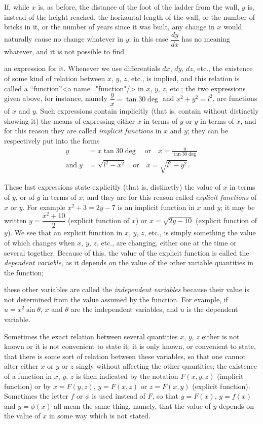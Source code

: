 \documentclass{ximera}
\begin{document}
If, while $x$ is, as before, the distance of the foot
of the ladder from the wall, $y$ is, instead of the
height reached, the horizontal length of the wall, or
the number of bricks in it, or the number of years
since it was built, any change in $x$ would naturally
cause no change whatever in $y$; in this case $\dfrac{dy}{dx}$ has
no meaning whatever, and it is not possible to find

an expression for it. Whenever we use differentials
$dx$, $dy$, $dz$, etc., the existence of some kind of
relation between $x$, $y$, $z$, etc., is implied, and this
relation is called a “function”<a name="function"/> in $x$, $y$, $z$, etc.; the
two expressions given above, for instance, namely
$\dfrac{y}{x} = \tan 30 \deg$ and $x^2 + y^2 = l^2$, are functions of $x$ and $y$.
Such expressions contain implicitly (that is, contain
without distinctly showing it) the means of expressing
either $x$ in terms of $y$ or $y$ in terms of $x$, and for
this reason they are called \textit{implicit functions} in
$x$ and $y$; they can be respectively put into the forms
\begin{align*}
y &= x \tan 30\deg \quad\text{or}\quad x = \frac{y}{\tan 30 \deg} \\
 \text{and}\;
y &= \sqrt{ l^2 - x^2} \quad\text{or}\quad x = \sqrt{ l^2 - y^2}.
\end{align*}

These last expressions state explicitly (that is, distinctly)
the value of $x$ in terms of $y$, or of $y$ in terms
of $x$, and they are for this reason called \textit{explicit
functions} of $x$ or $y$. For example $x^2 + 3 = 2y - 7$ is
an implicit function in $x$ and $y$; it may be written
$y = \dfrac{x^2 + 10}{2}$ (explicit function of $x$) or $x = \sqrt{2y - 10}$
(explicit function of $y$). We see that an explicit
function in $x$, $y$, $z$, etc., is simply something the
value of which changes when $x$, $y$, $z$, etc., are
changing, either one at the time or several together.
Because of this, the value of the explicit function is
called the \textit{dependent variable}, as it depends on the
value of the other variable quantities in the function;

these other variables are called the \textit{independent
variables} because their value is not determined from
the value assumed by the function. For example,
if $u = x^2 \sin \theta$, $x$ and $\theta$ are the independent variables,
and $u$ is the dependent variable.

Sometimes the exact relation between several
quantities $x$, $y$, $z$ either is not known or it is not
convenient to state it; it is only known, or convenient
to state, that there is some sort of relation
between these variables, so that one cannot alter
either $x$ or $y$ or $z$ singly without affecting the other
quantities; the existence of a function in $x$, $y$, $z$ is
then indicated by the notation $F(x, y, z)$ (implicit
function) or by $x = F(y, z)$, $y = F(x, z)$ or $z = F(x, y)$
(explicit function). Sometimes the letter $f$ or $\phi$ is used
instead of $F$, so that $y = F(x)$, $y = f(x)$ and $y = \phi(x)$
all mean the same thing, namely, that the value of $y$
depends on the value of $x$ in some way which is
not stated.
\end{document}
